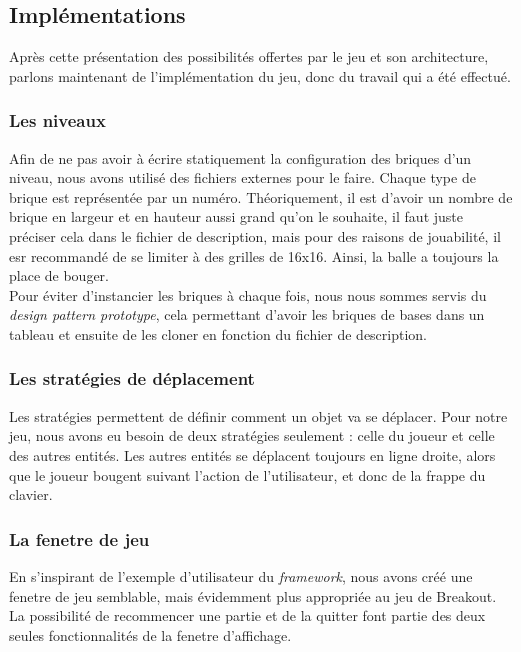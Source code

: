 \documentclass[a4paper,10pt]{article}
\begin{document}
\subsection{Implémentations}
    Après cette présentation des possibilités offertes par le jeu et son architecture, parlons maintenant
    de l'implémentation du jeu, donc du travail qui a été effectué.

    \subsubsection{Les niveaux}
        Afin de ne pas avoir à écrire statiquement la configuration des briques d'un niveau, nous avons
        utilisé des fichiers externes pour le faire. Chaque type de brique est représentée par un numéro.
        Théoriquement, il est d'avoir un nombre de brique en largeur et en hauteur aussi grand qu'on le souhaite,
        il faut juste préciser cela dans le fichier de description, mais pour des raisons de jouabilité, il
        esr recommandé de se limiter à des grilles de 16x16. Ainsi, la balle a toujours la place de bouger. \\

        Pour éviter d'instancier les briques à chaque fois, nous nous sommes servis du \textit{design pattern prototype},
        cela permettant d'avoir les briques de bases dans un tableau et ensuite de les cloner en fonction du
        fichier de description.

    \subsubsection{Les stratégies de déplacement}
        Les stratégies permettent de définir comment un objet va se déplacer. Pour notre jeu, nous avons eu besoin
        de deux stratégies seulement : celle du joueur et celle des autres entités. Les autres entités
        se déplacent toujours en ligne droite, alors que le joueur bougent suivant l'action de l'utilisateur, et donc
        de la frappe du clavier.

    \subsubsection{La fenetre de jeu}
        En s'inspirant de l'exemple d'utilisateur du \textit{framework}, nous avons créé une fenetre de jeu semblable,
        mais évidemment plus appropriée au jeu de Breakout. La possibilité de recommencer une partie et de la quitter
        font partie des deux seules fonctionnalités de la fenetre d'affichage. \\
\end{document}
